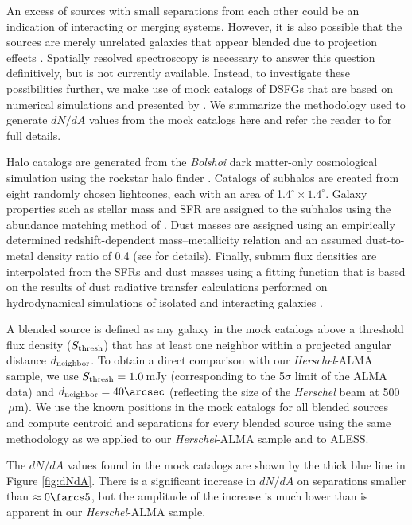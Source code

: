 \documentclass[iop]{emulateapj}
\begin{document}
An excess of sources with small separations from each other could be an
indication of interacting or merging systems.  However, it is also possible
that the sources are merely unrelated galaxies that appear blended due to
projection effects \citep{HB13}.  Spatially resolved spectroscopy is necessary
to answer this question definitively, but is not currently available.  Instead,
to investigate these possibilities further, we make use of mock catalogs of
DSFGs that are based on numerical simulations and presented by \citet{HB13}.
We summarize the methodology used to generate $dN/dA$ values from the mock
catalogs here and refer the reader to \citet{HB13} for full details. 

Halo catalogs are generated from the {\it Bolshoi} dark matter-only
cosmological simulation \citep{Klypin11} using the {\sc rockstar} halo finder
\citep{Behroozi13a,Behroozi13b}.  Catalogs of subhalos are created from eight
randomly chosen lightcones, each with an area of 1.4$^\circ \times 1.4^\circ$.
Galaxy properties such as stellar mass and SFR are assigned to the subhalos
using the abundance matching method of \citet{Behroozi13c}.  Dust masses are
assigned using an empirically determined redshift-dependent mass--metallicity
relation and an assumed dust-to-metal density ratio of 0.4 (see \citealt{HN13}
for details). Finally, submm flux densities are interpolated from the SFRs and
dust masses using a fitting function that is based on the results of dust
radiative transfer calculations performed on hydrodynamical simulations of
isolated and interacting galaxies \citep{H11,H12,HN13}.

A blended source is defined as any galaxy in the mock catalogs above a
threshold flux density ($S_{\rm thresh}$) that has at least one neighbor within
a projected angular distance $d_{\rm neighbor}$.  To obtain a direct comparison
with our {\it Herschel}-ALMA sample, we use $S_{\rm thresh} = 1.0\,$mJy (corresponding to the
5$\sigma$ limit of the ALMA data) and $d_{\rm neighbor} = 40\arcsec$
(reflecting the size of the {\it Herschel} beam at 500$\,\mu$m).  We use the
known positions in the mock catalogs for all blended sources and compute
centroid and separations for every blended source using the same methodology as
we applied to our {\it Herschel}-ALMA sample and to ALESS.  

The $dN/dA$ values found in the mock catalogs are shown by the
thick blue line in Figure \ref{fig:dNdA}.  There is a significant increase in
$dN/dA$ on separations smaller than $\approx 0\farcs5$, but the amplitude of
the increase is much lower than is apparent in our {\it Herschel}-ALMA sample. 
\end{document}
